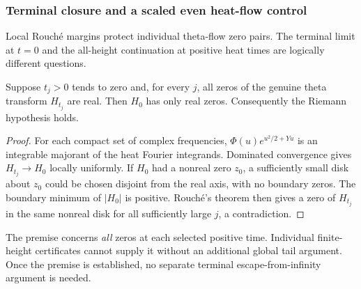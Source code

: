 \subsubsection{Terminal closure and a scaled even heat-flow control}
\label{subsec:terminal-closure-renewal}

Local Rouch\'e margins protect individual theta-flow
zero pairs. The terminal limit at $t=0$ and the
all-height continuation at positive heat times
are logically different questions.

\begin{theorem}
\label{thm:terminal-hurwitz}
Suppose $t_j>0$ tends to zero and, for every $j$,
all zeros of the genuine theta transform $H_{t_j}$
are real. Then $H_0$ has only real zeros.
Consequently the Riemann hypothesis holds.
\end{theorem}
\begin{proof}
For each compact set of complex frequencies,
$\Phi(u)e^{u^2/2+Y u}$ is an integrable
majorant of the heat Fourier integrands.
Dominated convergence gives
$H_{t_j}\to H_0$ locally uniformly.
If $H_0$ had a nonreal zero $z_0$,
a sufficiently small disk about $z_0$ could be
chosen disjoint from the real axis, with no
boundary zeros. The boundary minimum of
$|H_0|$ is positive. Rouch\'e's theorem
then gives a zero of $H_{t_j}$ in the same
nonreal disk for all sufficiently large $j$,
a contradiction.
\end{proof}

The premise concerns \emph{all} zeros at each
selected positive time. Individual finite-height
certificates cannot supply it without an
additional global tail argument.
Once the premise is established, no separate
terminal escape-from-infinity argument is needed.

